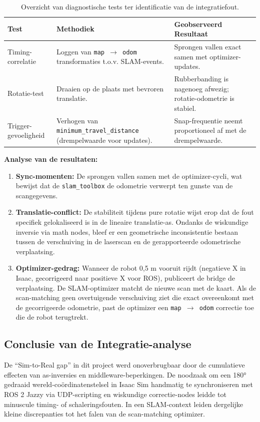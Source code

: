 \begin{table}[h]
\centering
\small
\begin{tabular}{lp{6cm}p{5cm}}
\hline
\textbf{Test} & \textbf{Methodiek} & \textbf{Geobserveerd Resultaat} \\ \hline
Timing-correlatie & Loggen van \texttt{map $\rightarrow$ odom} transformaties t.o.v. SLAM-events. & Sprongen vallen exact samen met optimizer-updates. \\
Rotatie-test & Draaien op de plaats met bevroren translatie. & Rubberbanding is nagenoeg afwezig; rotatie-odometrie is stabiel. \\
Trigger-gevoeligheid & Verhogen van \texttt{minimum\_travel\_distance} (drempelwaarde voor updates). & Snap-frequentie neemt proportioneel af met de drempelwaarde. \\ \hline
\end{tabular}
\caption{Overzicht van diagnostische tests ter identificatie van de integratiefout.}
\end{table}

\textbf{Analyse van de resultaten:}
\begin{enumerate}
    \item \textbf{Sync-momenten:} De sprongen vallen samen met de optimizer-cycli, wat bewijst dat de \texttt{slam\_toolbox} de odometrie verwerpt ten gunste van de scangegevens.
    \item \textbf{Translatie-conflict:} De stabiliteit tijdens pure rotatie wijst erop dat de fout specifiek gelokaliseerd is in de lineaire translatie-as. Ondanks de wiskundige inversie via math nodes, bleef er een geometrische inconsistentie bestaan tussen de verschuiving in de laserscan en de gerapporteerde odometrische verplaatsing.
    \item \textbf{Optimizer-gedrag:} Wanneer de robot 0,5 m vooruit rijdt (negatieve X in Isaac, gecorrigeerd naar positieve X voor ROS), publiceert de bridge de verplaatsing. De SLAM-optimizer matcht de nieuwe scan met de kaart. Als de scan-matching geen overtuigende verschuiving ziet die exact overeenkomt met de gecorrigeerde odometrie, past de optimizer een \texttt{map $\rightarrow$ odom} correctie toe die de robot terugtrekt.
\end{enumerate}

\subsection{Conclusie van de Integratie-analyse}
De ``Sim-to-Real gap'' in dit project werd onoverbrugbaar door de cumulatieve effecten van as-inversies en middleware-beperkingen. De noodzaak om een 180° gedraaid wereld-coördinatenstelsel in Isaac Sim handmatig te synchroniseren met ROS 2 Jazzy via UDP-scripting en wiskundige correctie-nodes leidde tot minuscule timing- of schaleringsfouten. In een SLAM-context leiden dergelijke kleine discrepanties tot het falen van de scan-matching optimizer. 

